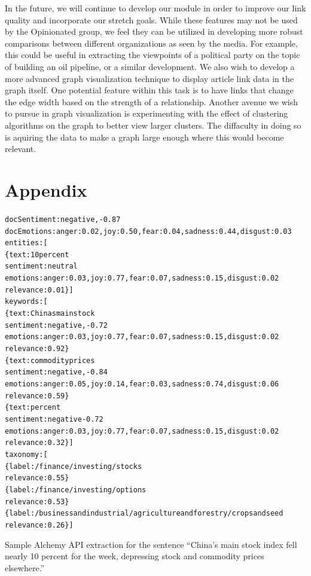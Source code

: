 \documentclass[12pt]{article}
\begin{document}
In the future, we will continue to develop our module in order to improve our link quality and incorporate our stretch goals. While these features may not be used by the Opinionated group, we feel they can be utilized in developing more robust comparisons between different organizations as seen by the media. For example, this could be useful in extracting the viewpoints of a political party on the topic of building an oil pipeline, or a similar development. We also wish to develop a more advanced graph visualization technique to display article link data in the graph itself. One potential feature within this task is to have links that change the edge width based on the strength of a relationship.  Another avenue we wish to pursue in graph visualization is experimenting with the effect of clustering algorithms on the graph to better view larger clusters.  The diffaculty in doing so is aquiring the data to make a graph large enough where this would become relevant. 

\newpage
\section{Appendix}
\begin{alltt}
docSentiment: negative, -0.87
docEmotions: anger: 0.02, joy: 0.50, fear: 0.04, sadness: 0.44, disgust: 0.03
entities: [
  \{ text: 10 percent
    sentiment: neutral
    emotions: anger: 0.03, joy: 0.77, fear: 0.07, sadness: 0.15, disgust: 0.02
    relevance: 0.01 \} ]
keywords: [
  \{ text: Chinas main stock
    sentiment: negative, -0.72
    emotions: anger: 0.03, joy: 0.77, fear: 0.07, sadness: 0.15, disgust: 0.02
    relevance: 0.92 \}
  \{ text: commodity prices
    sentiment: negative, -0.84
    emotions: anger: 0.05, joy: 0.14, fear: 0.03, sadness: 0.74, disgust: 0.06
    relevance: 0.59 \}
  \{ text: percent
    sentiment: negative -0.72
    emotions: anger: 0.03, joy: 0.77, fear: 0.07, sadness: 0.15, disgust: 0.02
    relevance: 0.32 \} ]
taxonomy: [
  \{ label: /finance/investing/stocks
    relevance: 0.55 \}
  \{ label: /finance/investing/options
    relevance: 0.53 \}
  \{ label: /business and industrial/agriculture and forestry/crops and seed
    relevance: 0.26 \} ]
\end{alltt}
Sample Alchemy API extraction for the sentence ``China's main stock index fell nearly 10 percent for the week, depressing stock and commodity prices elsewhere.''
\end{document}
